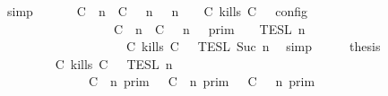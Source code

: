 \begin{isabellebody}
\ simp\isanewline
\ \ \isamarkupfalse%
\ \isamarkupfalse%
\ {\isacartoucheopen}{\isasymlbrakk}\ {\isacharparenleft}{\isacharparenleft}C\ {\isasymUp}\ n{\isacharparenright}\ {\isacharhash}\ {\isacharparenleft}C\ {\isasymnot}{\isasymUp}\ {\isasymge}\ n{\isacharparenright}\ {\isacharhash}\ {\isasymGamma}{\isacharparenright}{\isacharcomma}\ n\ {\isasymturnstile}\ {\isasymPsi}\ {\isasymtriangleright}\ {\isacharparenleft}{\isacharparenleft}C\ kills\ C\ {\isacharhash}\ {\isasymPhi}{\isacharparenright}\ {\isasymrbrakk}\isactrlsub c\isactrlsub o\isactrlsub n\isactrlsub f\isactrlsub i\isactrlsub g\isanewline
\ \ \ \ \ \ \ \ \ \ \ \ \ \ \ \ {\isacharequal}\ {\isasymlbrakk}{\isasymlbrakk}\ {\isacharparenleft}C\ {\isasymUp}\ n{\isacharparenright}\ {\isacharhash}\ {\isacharparenleft}C\ {\isasymnot}{\isasymUp}\ {\isasymge}\ n{\isacharparenright}\ {\isacharhash}\ {\isasymGamma}\ {\isasymrbrakk}{\isasymrbrakk}\isactrlsub p\isactrlsub r\isactrlsub i\isactrlsub m\ {\isasyminter}\ {\isasymlbrakk}{\isasymlbrakk}\ {\isasymPsi}\ {\isasymrbrakk}{\isasymrbrakk}\isactrlsub T\isactrlsub E\isactrlsub S\isactrlsub L\isactrlbsup {\isasymge}\ n\isactrlesup \isanewline
\ \ \ \ \ \ \ \ \ \ \ \ \ \ \ \ \ \ {\isasyminter}\ {\isasymlbrakk}{\isasymlbrakk}\ {\isacharparenleft}C\ kills\ C\ {\isacharhash}\ {\isasymPhi}\ {\isasymrbrakk}{\isasymrbrakk}\isactrlsub T\isactrlsub E\isactrlsub S\isactrlsub L\isactrlbsup {\isasymge}\ Suc\ n\isactrlesup {\isacartoucheclose}\ \isamarkupfalse%
\ simp\isanewline
\ \ \isamarkupfalse%
\ \isamarkupfalse%
\ {\isacharquery}thesis\isanewline
\ \ \ \ \isamarkupfalse%
\ {\isacharminus}\isanewline
\ \ \ \ \ \ \isamarkupfalse%
\ {\isacartoucheopen}{\isasymlbrakk}{\isasymlbrakk}\ {\isacharparenleft}C\ kills\ C\ {\isacharhash}\ {\isasymPsi}\ {\isasymrbrakk}{\isasymrbrakk}\isactrlsub T\isactrlsub E\isactrlsub S\isactrlsub L\isactrlbsup {\isasymge}\ n\isactrlesup \isanewline
\ \ \ \ \ \ \ \ \ \ \ \ {\isacharequal}\ {\isacharparenleft}{\isasymlbrakk}\ {\isacharparenleft}C\ {\isasymnot}{\isasymUp}\ n{\isacharparenright}\ {\isasymrbrakk}\isactrlsub p\isactrlsub r\isactrlsub i\isactrlsub m\ {\isasymunion}\ {\isasymlbrakk}\ {\isacharparenleft}C\ {\isasymUp}\ n{\isacharparenright}\ {\isasymrbrakk}\isactrlsub p\isactrlsub r\isactrlsub i\isactrlsub m\ {\isasyminter}\ {\isasymlbrakk}\ {\isacharparenleft}C\ {\isasymnot}{\isasymUp}\ {\isasymge}\ n{\isacharparenright}\ {\isasymrbrakk}\isactrlsub p\isactrlsub r\isactrlsub i\isactrlsub m{\isacharparenright}\isanewline

\end{isabellebody}

